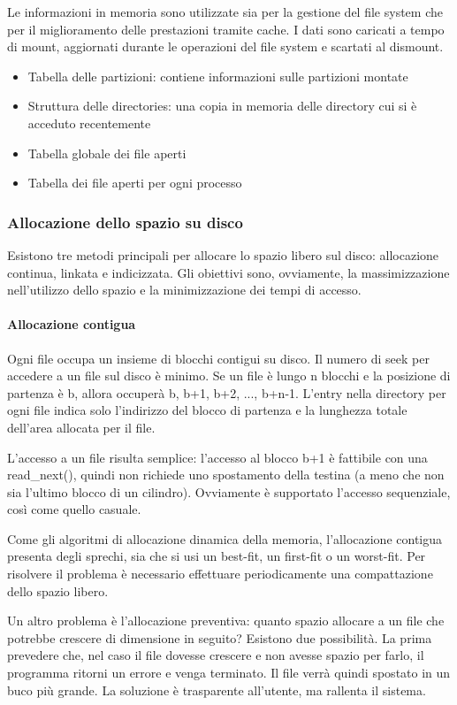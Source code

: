 \documentclass[a4paper]{article}
\begin{document}
Le informazioni in memoria sono utilizzate sia per la gestione del file system che per il miglioramento delle prestazioni tramite cache. I dati sono caricati a tempo di mount, aggiornati durante le operazioni del file system e scartati al dismount.
\begin{itemize}
   \item Tabella delle partizioni: contiene informazioni sulle partizioni montate
   \item Struttura delle directories: una copia in memoria delle directory cui si è acceduto recentemente
   \item Tabella globale dei file aperti
   \item Tabella dei file aperti per ogni processo
\end{itemize}

\subsubsection{Allocazione dello spazio su disco}
Esistono tre metodi principali per allocare lo spazio libero sul disco: allocazione continua, linkata e indicizzata. Gli obiettivi sono, ovviamente, la massimizzazione nell'utilizzo dello spazio e la minimizzazione dei tempi di accesso.

\paragraph{Allocazione contigua}
Ogni file occupa un insieme di blocchi contigui su disco. Il numero di seek per accedere a un file sul disco è minimo. Se un file è lungo n blocchi e la posizione di partenza è b, allora occuperà b, b+1, b+2, ..., b+n-1. L'entry nella directory per ogni file indica solo l'indirizzo del blocco di partenza e la lunghezza totale dell'area allocata per il file.

L'accesso a un file risulta semplice: l'accesso al blocco b+1 è fattibile con una read\_next(), quindi non richiede uno spostamento della testina (a meno che non sia l'ultimo blocco di un cilindro). Ovviamente è supportato l'accesso sequenziale, così come quello casuale.

Come gli algoritmi di allocazione dinamica della memoria, l'allocazione contigua presenta degli sprechi, sia che si usi un best-fit, un first-fit o un worst-fit. Per risolvere il problema è necessario effettuare periodicamente una compattazione dello spazio libero.

Un altro problema è l'allocazione preventiva: quanto spazio allocare a un file che potrebbe crescere di dimensione in seguito? Esistono due possibilità. La prima prevedere che, nel caso il file dovesse crescere e non avesse spazio per farlo, il programma ritorni un errore e venga terminato. Il file verrà quindi spostato in un buco più grande. La soluzione è trasparente all'utente, ma rallenta il sistema.
\end{document}
